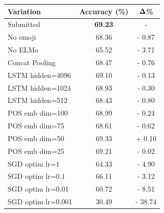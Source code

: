 \documentclass[11pt,a4paper]{article}
\begin{document}
\begin{table}[!h]
    \centering
    \footnotesize

    \begin{tabular}{lcc}

        \textbf{Variation} & \textbf{Accuracy (\%)} & $\bf{\Delta}$\textbf{\%} \\
        \hline
        \hline
        Submitted          & \textbf{69.23}         & -                        \\
        \hline
        No emoji           & 68.36                  & - 0.87                   \\
        \hline
        No ELMo            & 65.52                  & - 3.71                   \\
        \hline
        Concat Pooling     & 68.47                  & - 0.76                   \\
        \hline
        LSTM hidden=4096   & 69.10                  & - 0.13                   \\
        LSTM hidden=1024   & 68.93                  & - 0.30                   \\
        LSTM hidden=512    & 68.43                  & - 0.80                   \\
        \hline
        POS emb dim=100    & 68.99                  & - 0.24                   \\
        POS emb dim=75     & 68.61                  & - 0.62                   \\
        POS emb dim=50     & 69.33                  & + 0.10                   \\
        POS emb dim=25     & 69.21                  & - 0.02                   \\
        \hline
        SGD optim lr=1     & 64.33                  & - 4.90                   \\
        SGD optim lr=0.1   & 66.11                  & - 3.12                   \\
        SGD optim lr=0.01  & 60.72                  & - 8.51                   \\
        SGD optim lr=0.001 & 30.49                  & - 38.74                  \\

    \end{tabular}


\end{table}
\end{document}
